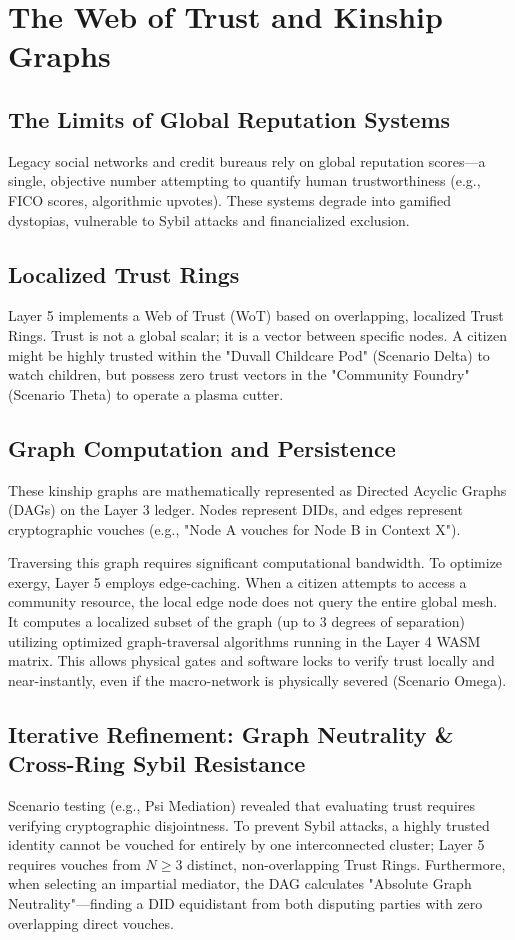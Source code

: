 \chapter{The Web of Trust and Kinship Graphs}

\section{The Limits of Global Reputation Systems}
Legacy social networks and credit bureaus rely on global reputation scores—a single, objective number attempting to quantify human trustworthiness (e.g., FICO scores, algorithmic upvotes). These systems degrade into gamified dystopias, vulnerable to Sybil attacks and financialized exclusion.

\section{Localized Trust Rings}
Layer 5 implements a Web of Trust (WoT) based on overlapping, localized Trust Rings. Trust is not a global scalar; it is a vector between specific nodes. A citizen might be highly trusted within the "Duvall Childcare Pod" (Scenario Delta) to watch children, but possess zero trust vectors in the "Community Foundry" (Scenario Theta) to operate a plasma cutter.

\section{Graph Computation and Persistence}
These kinship graphs are mathematically represented as Directed Acyclic Graphs (DAGs) on the Layer 3 ledger. Nodes represent DIDs, and edges represent cryptographic vouches (e.g., "Node A vouches for Node B in Context X").

Traversing this graph requires significant computational bandwidth. To optimize exergy, Layer 5 employs edge-caching. When a citizen attempts to access a community resource, the local edge node does not query the entire global mesh. It computes a localized subset of the graph (up to 3 degrees of separation) utilizing optimized graph-traversal algorithms running in the Layer 4 WASM matrix. This allows physical gates and software locks to verify trust locally and near-instantly, even if the macro-network is physically severed (Scenario Omega).

\section{Iterative Refinement: Graph Neutrality \& Cross-Ring Sybil Resistance}
Scenario testing (e.g., Psi Mediation) revealed that evaluating trust requires verifying cryptographic disjointness. To prevent Sybil attacks, a highly trusted identity cannot be vouched for entirely by one interconnected cluster; Layer 5 requires vouches from $N \ge 3$ distinct, non-overlapping Trust Rings. Furthermore, when selecting an impartial mediator, the DAG calculates "Absolute Graph Neutrality"—finding a DID equidistant from both disputing parties with zero overlapping direct vouches.


